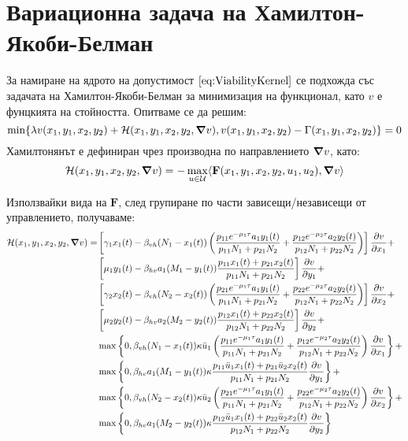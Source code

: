 \section{Вариационна задача на Хамилтон-Якоби-Белман}
За намиране на ядрото на допустимост $\eqref{eq:ViabilityKernel}$ се подхожда със задачата на Хамилтон-Якоби-Белман за минимизация на функционал, като $v$ е фунцкията на стойността. Опитваме се да решим:
\begin{equation}
  \label{eq:HJB}
  \min\{\lambda v(x_1, y_1, x_2, y_2) + \mathcal{H}(x_1, y_1, x_2, y_2, \grad{v}), v(x_1, y_1, x_2, y_2) - \Gamma(x_1, y_1, x_2, y_2)\} = 0
\end{equation}
Хамилтонянът е дефиниран чрез производна по направлението $\grad{v}$, като:
\begin{equation}
  \label{eq:Hamiltonian}
  \mathcal{H}(x_1, y_1, x_2, y_2, \grad{v}) = - \max_{u \in \mathcal{U}}\langle \mathbf{F}(x_1,y_1,x_2,y_2,u_1,u_2), \grad{v} \rangle
\end{equation}

Използвайки вида на $\mathbf{F}$, след групиране по части зависещи/независещи от управлението, получаваме:
\begin{align*}
  \label{eq:HamiltonianFull}
  \mathcal{H}(x_1, y_1, x_2, y_2, \grad{v}) = &\left[\gamma_1 x_1(t) - \beta_{vh} (N_1-x_1(t)) \left(\frac{p_{11} e^{-\mu_1 \tau} a_1 y_1(t)}{p_{11} N_1 + p_{21} N_2} + \frac{p_{12} e^{-\mu_2 \tau} a_2 y_2(t)}{p_{12} N_1 + p_{22} N_2 }\right) \right] \pdv{v}{x_1} + \\
  &\left[\mu_1 y_1(t) - \beta_{hv} a_1 (M_1-y_1(t)) \frac{p_{11} x_1(t) + p_{21} x_2(t)}{p_{11} N_1 + p_{21} N_2}\right] \pdv{v}{y_1} + \\
  &\left[\gamma_2 x_2(t) - \beta_{vh} (N_2-x_2(t)) \left(\frac{p_{21} e^{-\mu_1 \tau} a_1 y_1(t)}{p_{11} N_1 + p_{21} N_2 } + \frac{p_{22} e^{-\mu_2 \tau} a_2 y_2(t)}{p_{12} N_1 + p_{22} N_2}\right) \right] \pdv{v}{x_2} + \\
  &\left[\mu_2 y_2(t) - \beta_{hv} a_2 (M_2-y_2(t)) \frac{p_{12} x_1(t) + p_{22} x_2(t)}{p_{12} N_1 + p_{22} N_2}\right] \pdv{v}{y_2} + \\
  & \max\left\{0,\beta_{vh} (N_1-x_1(t)) \kappa \bar{u}_1 \left(\frac{p_{11} e^{-\mu_1 \tau} a_1 y_1(t)}{p_{11} N_1 + p_{21} N_2} + \frac{p_{12} e^{-\mu_2 \tau} a_2  y_2(t)}{p_{12} N_1 + p_{22} N_2 }\right) \pdv{v}{x_1}\right\} + \\
  & \max\left\{0,\beta_{hv} a_1 (M_1-y_1(t)) \kappa \frac{p_{11} \bar{u}_1 x_1(t) + p_{21} \bar{u}_2 x_2(t)}{p_{11} N_1 + p_{21} N_2} \pdv{v}{y_1}\right\} + \\
  & \max\left\{0,\beta_{vh} (N_2-x_2(t)) \kappa \bar{u}_2 \left(\frac{p_{21} e^{-\mu_1 \tau} a_1 y_1(t)}{p_{11} N_1 + p_{21} N_2} + \frac{p_{22} e^{-\mu_2 \tau} a_2 y_2(t)}{p_{12} N_1 + p_{22} N_2}\right) \pdv{v}{x_2}\right\} + \\
  & \max\left\{0,\beta_{hv} a_1 (M_2-y_2(t)) \kappa \frac{p_{12} \bar{u}_1 x_1(t) + p_{22} \bar{u}_2 x_2(t)}{p_{12} N_1 + p_{22} N_2} \pdv{v}{y_2}\right\}
\end{align*}
